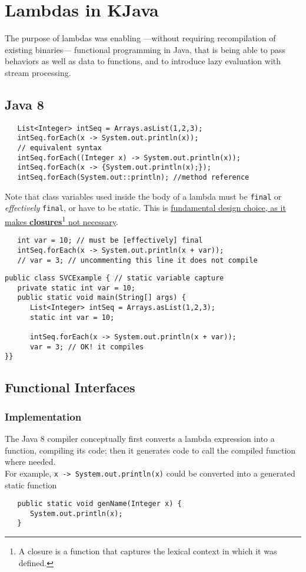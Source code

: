 \chapter{Lambdas in KJava}
The purpose of lambdas was enabling ---without requiring recompilation of existing binaries--- functional programming in Java, that is being able to pass behaviors as well as data to functions, and to introduce lazy evaluation with stream processing.
\section{Java 8}
\lstset{style=javaBlockAnn}
\begin{lstlisting}
   List<Integer> intSeq = Arrays.asList(1,2,3);
   intSeq.forEach(x -> System.out.println(x));
   // equivalent syntax
   intSeq.forEach((Integer x) -> System.out.println(x));
   intSeq.forEach(x -> {System.out.println(x);});
   intSeq.forEach(System.out::println); //method reference
\end{lstlisting}

Note that class variables used inside the body of a lambda must be \lstinline|final| or \textit{effectively} \lstinline|final|, or have to be static.
This is \ul{fundamental design choice, as it makes \textbf{closures}\footnote{A closure is a function that captures the lexical context in which it was defined.} not necessary}.
\begin{lstlisting}
   int var = 10; // must be [effectively] final
   intSeq.forEach(x -> System.out.println(x + var));
   // var = 3; // uncommenting this line it does not compile
\end{lstlisting}
\begin{lstlisting}
public class SVCExample { // static variable capture
   private static int var = 10;
   public static void main(String[] args) {
      List<Integer> intSeq = Arrays.asList(1,2,3);
      static int var = 10;
   
      intSeq.forEach(x -> System.out.println(x + var));
      var = 3; // OK! it compiles
}}
   \end{lstlisting}

\section{Functional Interfaces}
\subsection{Implementation}
The Java 8 compiler conceptually first converts a lambda
expression into a function, compiling its code; 
then it generates code to call the compiled function where
needed.\\
For example, \lstinline|x -> System.out.println(x)| could be
converted into a generated static function
\begin{lstlisting}
   public static void genName(Integer x) {
      System.out.println(x);
   }
\end{lstlisting}


